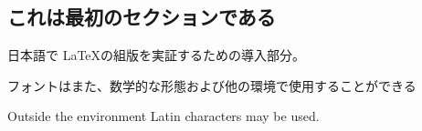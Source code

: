 \documentclass{article}
\begin{document}
\begin{CJK}{UTF8}{min}
\section{これは最初のセクションである}
日本語で \LaTeX の組版を実証するための導入部分。

フォントはまた、数学的な形態および他の環境で使用することができる
\end{CJK}

\bigskip

Outside the environment Latin characters may be used.
\end{document}
